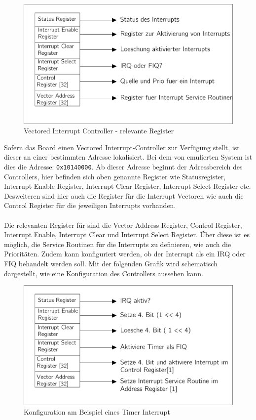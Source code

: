\begin{figure}[H]
	\begin{center}	
	\caption{Vectored Interrupt Controller - relevante Register}
	\includegraphics[scale=0.60]{common/vic.pdf}
	\end{center}
	\label{vicSchema}
\end{figure}
\noindent
Sofern das Board einen Vectored Interrupt-Controller zur Verf\"ugung stellt, ist dieser an einer bestimmten Adresse lokalisiert. Bei dem von \mops emulierten System ist dies die Adresse: \texttt{0x10140000}\parencite[vgl.][223]{archManI}. Ab dieser Adresse beginnt der Adressbereich des Controllers, hier befinden sich oben genannte Register wie Statusregister, Interrupt Enable Register, Interrupt Clear Register, Interrupt Select Register etc. Desweiteren sind hier auch die Register f\"ur die Interrupt Vectoren wie auch die Control Register f\"ur die jeweiligen Interrupts \parencite[vgl.][35]{vic} vorhanden.\\\\
Die relevanten Register f\"ur \mops sind die Vector Address Register, Control Register, Interrupt Enable, Interrupt Clear und Interrupt Select Register. \"Uber diese ist es m\"oglich, die Service Routinen f\"ur die Interrupts zu definieren, wie auch die Priorit\"aten. Zudem kann konfiguriert werden, ob der Interrupt als ein IRQ oder FIQ behandelt werden soll. Mit der folgenden Grafik wird schematisch dargestellt, wie eine Konfiguration des Controllers aussehen kann.
\begin{figure}[H]
	\begin{center}	
	\caption{Konfiguration am Beispiel eines Timer Interrupt}
	\includegraphics[scale=0.60]{common/vicsample.pdf}
	\end{center}
	\label{draft:vicSample}
\end{figure}
